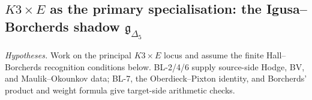 \subsection{\texorpdfstring{$K3 \times E$}{K3 x E} as the primary specialisation: the Igusa--Borcherds shadow \texorpdfstring{$\mathfrak{g}_{\Delta_5}$}{g-Delta-5}}
\label{sec:k3xE-delta5-specialisation}

\begin{theorem}
\label{thm:g-delta5-is-sp-k3}
\noindent\emph{Hypotheses.} Work on the principal $K3\times E$ locus and assume the finite Hall--Borcherds recognition conditions below. BL-2/4/6 supply source-side Hodge, BV, and Maulik--Okounkov data; BL-7, the Oberdieck--Pixton identity, and Borcherds' product and weight formula give target-side arithmetic checks.


\end{theorem}
